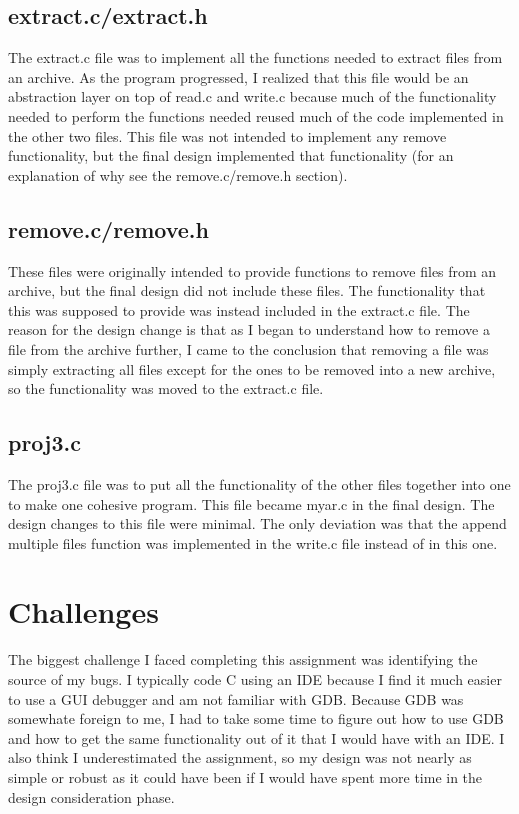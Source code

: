 \documentclass{article}
\begin{document}
\subsection{extract.c/extract.h}
The extract.c file was to implement all the functions needed to extract files from an archive.  As the program progressed, I realized that this file would be an abstraction layer on top of read.c and write.c because much of the functionality needed to perform the functions needed reused much of the code implemented in the other two files.  This file was not intended to implement any remove functionality, but the final design implemented that functionality (for an explanation of why see the remove.c/remove.h section).
\subsection{remove.c/remove.h}
These files were originally intended to provide functions to remove files from an archive, but the final design did not include these files.  The functionality that this was supposed to provide was instead included in the extract.c file.  The reason for the design change is that as I began to understand how to remove a file from the archive further, I came to the conclusion that removing a file was simply extracting all files except for the ones to be removed into a new archive, so the functionality was moved to the extract.c file.
\subsection{proj3.c}
The proj3.c file was to put all the functionality of the other files together into one to make one cohesive program.  This file became myar.c in the final design.  The design changes to this file were minimal.  The only deviation was that the append multiple files function was implemented in the write.c file instead of in this one.


\section{Challenges}
The biggest challenge I faced completing this assignment was identifying the source of my bugs.  I typically code C using an IDE because I find it much easier to use a GUI debugger and am not familiar with GDB.  Because GDB was somewhate foreign to me, I had to take some time to figure out how to use GDB and how to get the same functionality out of it that I would have with an IDE.  I also think I underestimated the assignment, so my design was not nearly as simple or robust as it could have been if I would have spent more time in the design consideration phase.
\end{document}
